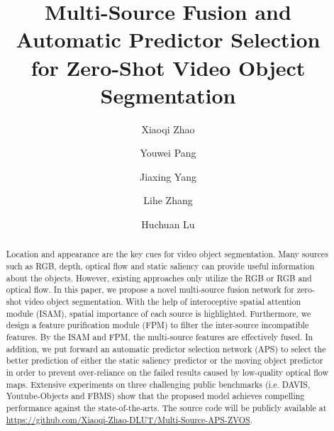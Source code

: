 \documentclass[sigconf]{acmart}
\begin{document}
\fancyhead{}
\title{Multi-Source Fusion and Automatic Predictor Selection \\ for Zero-Shot Video Object Segmentation}





\author{Xiaoqi Zhao}
\author{Youwei Pang}
\author{Jiaxing Yang}

\author{Lihe Zhang}
\authornotemark[0]
\author{Huchuan Lu}






\begin{abstract}
  Location and appearance are the key cues for video object segmentation. Many sources such as RGB, depth, optical flow and static saliency can provide useful information about the objects. However, existing approaches only utilize the RGB or RGB and optical flow. 
In this paper, we propose a novel multi-source fusion network for zero-shot video object segmentation. With the help of interoceptive spatial attention module (ISAM), spatial importance  of each source is highlighted. Furthermore, we design a feature purification module (FPM) to filter the inter-source incompatible features. By the ISAM and FPM, the multi-source features are effectively fused.
In addition, we put forward an automatic predictor selection network (APS) to select the better prediction of either the static saliency predictor or the moving object predictor in order to prevent over-reliance on the failed results caused by low-quality optical flow maps. 
Extensive experiments on three challenging public benchmarks (i.e. DAVIS, Youtube-Objects and FBMS) show that the proposed model achieves compelling performance against the state-of-the-arts. The source code will be publicly available at \textcolor{red}{\url{https://github.com/Xiaoqi-Zhao-DLUT/Multi-Source-APS-ZVOS}}.
\end{abstract}
\end{document}
